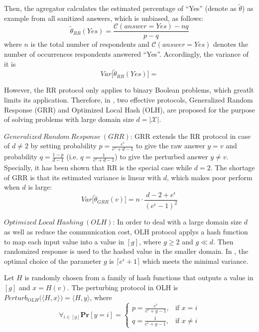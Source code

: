 \documentclass[conference]{IEEEtran}
\begin{document}
Then, the agregator calculates the estimated percentage of ``Yes'' (denote as $\tilde{\theta}$) as example  from all sanitized answers, which is unbiased, as follows: 
$$\tilde{\theta}_{RR}(Yes) = \frac{\mathcal{C}(answer=Yes) - nq}{p-q}$$
where $n$ is the total number of respondents and $\mathcal{C}(answer=Yes)$ denotes the number of occurrences respondents answered ``Yes''. Accordingly, the variance of it is 
{\color{red}$$Var \big[\tilde{\theta}_{RR}(Yes) \big] = $$}

However, the RR protocol only applies to binary Boolean problems, which greatlt limits its application. Therefore, in \cite{a8}, two effective protocols, Generalized Random Response (GRR) and Optimized Local Hash (OLH), are proposed for the purpose of solving problems with large domain size $d = |\mathcal{X}|$.

$Generalized\ Random\ Response\ (GRR)$\cite{a8}: GRR extends the RR protocol in case of $d \neq 2$ by setting probability $p = \frac{e^{\epsilon}}{e^{\epsilon} + d - 1}$ to give the raw answer $y = v$ and probability $q = \frac{1-p}{d-1}$ (i.e. $q =\frac{1}{e^{\epsilon} + d - 1}$) to give the perturbed answer $y \neq v$. Specially, it has been shown that RR is the special case while $d = 2$. The shortage of GRR is that its estimated variance is linear with $d$, which makes poor perform when $d$ is large: 
\begin{equation}
Var\big[\tilde{\theta}_{GRR}(v)\big] = n \cdot \frac{d - 2+e^{\epsilon}}{(e^{\epsilon}-1)^2} 
\label{grr variance}
\end{equation}


$Optimized\ Local\ Hashing\ (OLH)$\cite{a8}: In order to deal with a large domain size $d$ as well as reduce the communication cost, OLH protocol applys a hash function to map each input value into a value in $[g]$, where $g \geq 2$ and $g \ll d$. Then randomized response is used to the hashed value in the smaller domain. In \cite{a8}, the optimal choice of the parameter $g$ is $\lceil e^{\epsilon}+1 \rceil$ which meets the minimal variance.

Let $H$ is randomly chosen from a family of hash functions that outputs a value in $[g]$ and $x = H(v)$. The perturbing protocol in OLH is $Perturb_{OLH} \big(\langle H,x \rangle \big) = \langle H,y \rangle$, where
$$\forall_{i\in [g]} \mathbf{Pr} [y=i] = 
\begin{cases}
p = \frac{e^{\epsilon}}{e^{\epsilon}+g-1},&\text{if $x=i$} \\
q = \frac{1}{e^{\epsilon}+g-1},&\text{if $x\neq i$}
\end{cases}
$$
\end{document}
